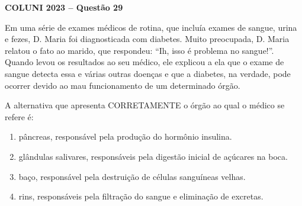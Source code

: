 \textbf{COLUNI 2023 -- Questão 29}\par\medskip Em uma série de exames médicos de rotina, que incluía exames de sangue, urina e fezes, D. Maria foi diagnosticada com diabetes. Muito preocupada, D. Maria relatou o fato ao marido, que respondeu: “Ih, isso é problema no sangue!”. Quando levou os resultados ao seu médico, ele explicou a ela que o exame de sangue detecta essa e várias outras doenças e que a diabetes, na verdade, pode ocorrer devido ao mau funcionamento de um determinado órgão.

\par

A alternativa que apresenta CORRETAMENTE o órgão ao qual o médico se refere é:\begin{enumerate}
\item pâncreas, responsável pela produção do hormônio insulina.
\item glândulas salivares, responsáveis pela digestão inicial de açúcares na boca.
\item baço, responsável pela destruição de células sanguíneas velhas.
\item rins, responsáveis pela filtração do sangue e eliminação de excretas.\end{enumerate}
